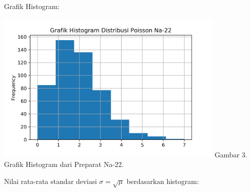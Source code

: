 \documentclass{article}
\begin{document}
			Grafik Histogram:
			\begin{center}
				\includegraphics[width=110mm]{Data/Na-22.png}
				Gambar 3. Grafik Histogram dari Preparat Na-22.
			\end{center}
			Nilai rata-rata standar deviasi $\sigma = \sqrt{\mu}$ berdasarkan histogram:\\
			
\end{document}
